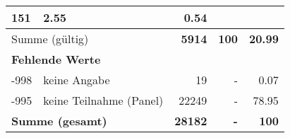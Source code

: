 \begin{longtable}{lXrrr}
       \num{151} &
       \num[round-mode=places,round-precision=2]{2.55} &
         \num[round-mode=places,round-precision=2]{0.54} \\
     \midrule
     \multicolumn{2}{l}{Summe (gültig)} &
       \textbf{\num{5914}} &
     \textbf{100} &
       \textbf{\num[round-mode=places,round-precision=2]{20.99}} \\
     \multicolumn{5}{l}{\textbf{Fehlende Werte}}\\
       -998 &
       keine Angabe &
         \num{19} &
        - &
         \num[round-mode=places,round-precision=2]{0.07} \\
       -995 &
       keine Teilnahme (Panel) &
         \num{22249} &
        - &
         \num[round-mode=places,round-precision=2]{78.95} \\
     \midrule
     \multicolumn{2}{l}{\textbf{Summe (gesamt)}} &
          \textbf{\num{28182}} &
        \textbf{-} &
        \textbf{100} \\
     \bottomrule
     \end{longtable}
     
